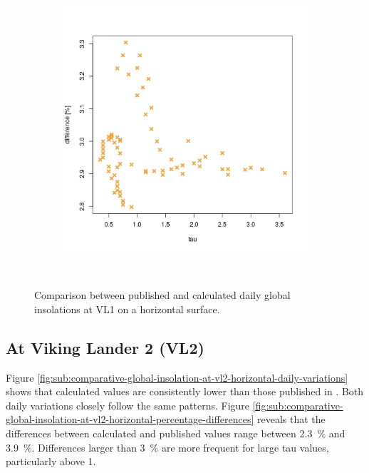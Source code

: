 \begin{figure}[H]
\begin{subfigure}[t]{\subfigureWidth}
    \end{subfigure}\hfill
    \begin{subfigure}[t]{\subfigureWidth}
        \centering
            \includegraphics[height=\graphicsHeight]{sections/appendix/A/plots/hh-diff-bet-exp-calc-at-vl1.png}
            \label{fig:sub:comparative-global-insolation-at-vl1-horizontal-percentage-differences}
    \end{subfigure}\\[0.8ex]
    \caption{Comparison between published and calculated daily global insolations at VL1 on a horizontal surface.}
    \label{fig:plot:comparative-global-insolation-at-vl1-horizontal}
\vspace{-2ex}
\end{figure}

\subsection{At Viking Lander 2 (VL2)}
Figure \ref{fig:sub:comparative-global-insolation-at-vl2-horizontal-daily-variations} shows that calculated values are consistently lower than those published in . Both daily variations closely follow the same patterns. Figure \ref{fig:sub:comparative-global-insolation-at-vl2-horizontal-percentage-differences} reveals that the differences between calculated and published values range between \SI{2.3}{\percent} and \SI{3.9}{\percent}. Differences larger than \SI{3}{\percent} are more frequent for large tau values, particularly above 1.

